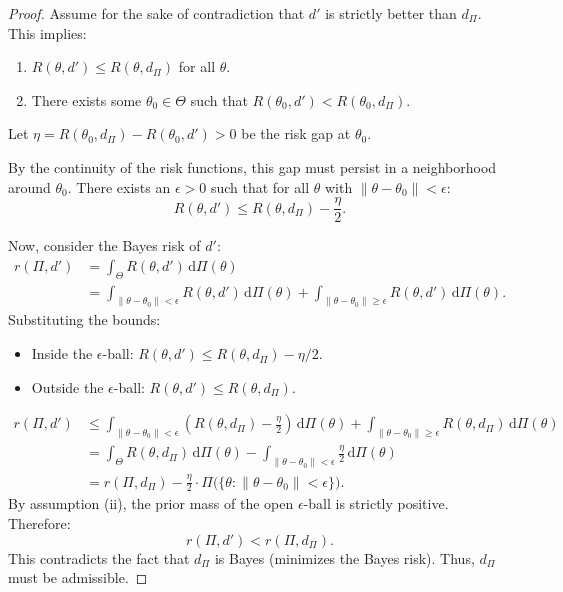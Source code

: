 \begin{proof}
Assume for the sake of contradiction that \(d'\) is strictly better than \(d_{\Pi}\).
This implies:
\begin{enumerate}[]
\item  \(R(\theta, d') \le R(\theta, d_{\Pi})\) for all \(\theta\).
\item  There exists some \(\theta_0 \in \Theta\) such that \(R(\theta_0, d') < R(\theta_0, d_{\Pi})\).
\end{enumerate}

Let \(\eta = R(\theta_0, d_\Pi) - R(\theta_0, d') > 0\) be the risk gap at \(\theta_0\).



By the continuity of the risk functions, this gap must persist in a neighborhood around \(\theta_0\). There exists an \(\epsilon > 0\) such that for all \(\theta\) with \(\|\theta - \theta_0\| < \epsilon\):
\[ R(\theta, d') \le R(\theta, d_{\Pi}) - \frac{\eta}{2}. \]

Now, consider the Bayes risk of \(d'\):
\[
\begin{split} 
r(\Pi, d') &= \int_{\Theta} R(\theta, d') \, \mathrm{d}\Pi(\theta) \\ 
&= \int_{\|\theta - \theta_0\| < \epsilon} R(\theta, d') \, \mathrm{d}\Pi(\theta) + \int_{\|\theta - \theta_0\| \ge \epsilon} R(\theta, d') \, \mathrm{d}\Pi(\theta).
\end{split}
\]
Substituting the bounds:
\begin{itemize}
    \item Inside the \(\epsilon\)-ball: \(R(\theta, d') \le R(\theta, d_{\Pi}) - \eta/2\).
    \item Outside the \(\epsilon\)-ball: \(R(\theta, d') \le R(\theta, d_{\Pi})\).
\end{itemize}
\[
\begin{split}
r(\Pi, d') &\leq \int_{\|\theta - \theta_0\| < \epsilon} \left( R(\theta, d_\Pi) - \frac{\eta}{2} \right) \, \mathrm{d}\Pi(\theta) + \int_{\|\theta - \theta_0\| \ge \epsilon} R(\theta, d_\Pi) \, \mathrm{d}\Pi(\theta) \\
&= \int_{\Theta} R(\theta, d_\Pi) \, \mathrm{d}\Pi(\theta) - \int_{\|\theta - \theta_0\| < \epsilon} \frac{\eta}{2} \, \mathrm{d}\Pi(\theta) \\
&= r(\Pi, d_\Pi) - \frac{\eta}{2} \cdot \Pi \big( \{\theta : \|\theta - \theta_0\| < \epsilon \} \big).
\end{split}
\]
By assumption (ii), the prior mass of the open \(\epsilon\)-ball is strictly positive. Therefore:
\[ r(\Pi, d') < r(\Pi, d_\Pi). \]
This contradicts the fact that \(d_{\Pi}\) is Bayes (minimizes the Bayes risk). Thus, \(d_{\Pi}\) must be admissible.
\end{proof}

